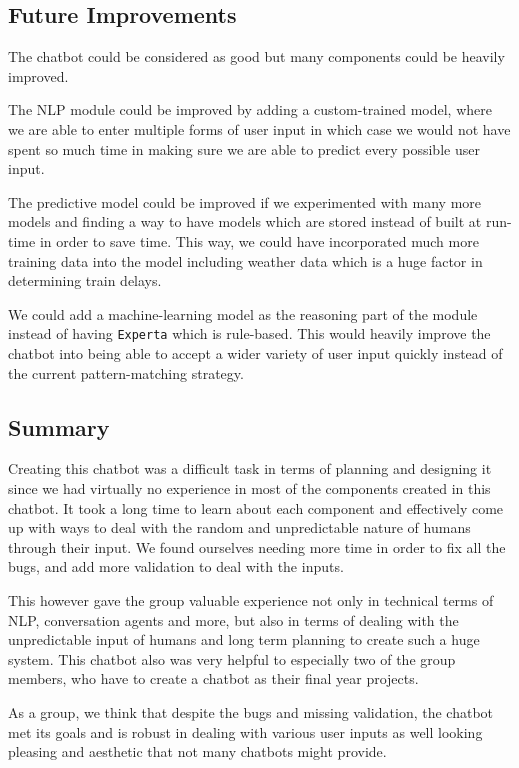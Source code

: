 \documentclass[11pt]{article}
\newcommand{\code}[1]{{\texttt{#1}}}
\begin{document}
    \subsection{Future Improvements}
    The chatbot could be considered as good but many components could be heavily improved.
    
    The NLP module could be improved by adding a custom-trained model, where we are able to enter multiple forms of user input in which case we would not have spent so much time in making sure we are able to predict every possible user input.
    
    The predictive model could be improved if we experimented with many more models and finding a way to have models which are stored instead of built at run-time in order to save time. This way, we could have incorporated much more training data into the model including weather data which is a huge factor in determining train delays.
    
    We could add a machine-learning model as the reasoning part of the module instead of having \code{Experta} which is rule-based. This would heavily improve the chatbot into being able to accept a wider variety of user input quickly instead of the current pattern-matching strategy.
    
    \subsection{Summary}
    Creating this chatbot was a difficult task in terms of planning and designing it since we had virtually no experience in most of the components created in this chatbot. It took a long time to learn about each component and effectively come up with ways to deal with the random and unpredictable nature of humans through their input. We found ourselves needing more time in order to fix all the bugs, and add more validation to deal with the inputs.
    
    This however gave the group valuable experience not only in technical terms of NLP, conversation agents and more, but also in terms of dealing with the unpredictable input of humans and long term planning to create such a huge system. This chatbot also was very helpful to especially two of the group members, who have to create a chatbot as their final year projects.
    
    As a group, we think that despite the bugs and missing validation, the chatbot met its goals and is robust in dealing with various user inputs as well looking pleasing and aesthetic that not many chatbots might provide.
\end{document}
